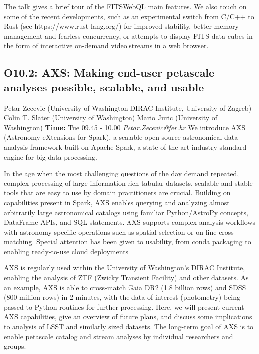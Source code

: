 \documentclass{report}
\begin{document}
The talk gives a brief tour of the FITSWebQL main features. We also touch on some of the recent developments, such as an experimental switch from C/C++ to Rust (see https://www.rust-lang.org/) for improved stability, better memory management and fearless concurrency, or attempts to display FITS data cubes in the form of interactive on-demand video streams in a web browser.\newline
\newpage
\subsection*{O10.2: AXS: Making end-user petascale analyses possible, scalable, and usable}
\bigskip
Petar Zecevic (University of Washington DIRAC Institute, University of Zagreb) \newline Colin T. Slater (University of Washington) \newline  Mario Juric (University of Washington)\newline   \newline  \newline  \newline\newline
{\bf Time:} Tue 09.45 - 10.00\newline
\newline
{\it Petar.Zecevic@fer.hr}\newline
\newline\newline
We introduce AXS (Astronomy eXtensions for Spark), a scalable open-source astronomical data analysis framework built on Apache Spark, a state-of-the-art industry-standard engine for big data processing.

In the age when the most challenging questions of the day demand repeated, complex processing of large information-rich tabular datasets, scalable and stable tools that are easy to use by domain practitioners are crucial. Building on capabilities present in Spark, AXS enables querying and analyzing almost arbitrarily large astronomical catalogs using familiar Python/AstroPy concepts, DataFrame APIs, and SQL statements. AXS supports complex analysis workflows with astronomy-specific operations such as spatial selection or on-line cross-matching. Special attention has been given to usability, from conda packaging to enabling ready-to-use cloud deployments.

AXS is regularly used within the University of Washington's DIRAC Institute, enabling the analysis of ZTF (Zwicky Transient Facility) and other datasets. As an example, AXS is able to cross-match Gaia DR2 (1.8 billion rows) and SDSS (800 million rows) in 2 minutes, with the data of interest (photometry) being passed to Python routines for further processing. Here, we will present current AXS capabilities, give an overview of future plans, and discuss some implications to analysis of LSST and similarly sized datasets. The long-term goal of AXS is to enable petascale catalog and stream analyses by individual researchers and groups.\newline
\newpage
\end{document}
